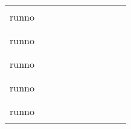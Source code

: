 \documentclass[12pt]{article}
\newcommand{\cbox}{\raisebox{.6ex}{\fbox{\rule{0in}{0.05in}\rule{0.05in}{0in}}}}
\newcommand{\eline}{\rule{0.4in}{0.01in}}
\newcommand{\cmline}{\rule{2.0in}{0.01in}}
\begin{document}
\begin{tabular}{lccccccccc}
runno & \cbox & \cbox & \eline & \eline & \eline & \eline & \eline & \cbox & \cmline \\[0.240in]
runno & \cbox & \cbox & \eline & \eline & \eline & \eline & \eline & \cbox & \cmline \\[0.240in]
runno & \cbox & \cbox & \eline & \eline & \eline & \eline & \eline & \cbox & \cmline \\[0.240in]
runno & \cbox & \cbox & \eline & \eline & \eline & \eline & \eline & \cbox & \cmline \\[0.240in]
runno & \cbox & \cbox & \eline & \eline & \eline & \eline & \eline & \cbox & \cmline \\[0.240in]
\end{tabular}
\end{document}
